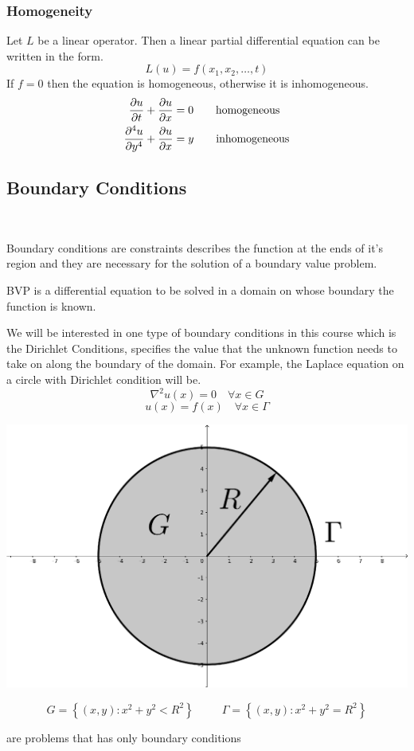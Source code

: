 \documentclass[]{article}
\begin{document}
\subsubsection{Homogeneity}
Let $L$ be a linear operator. Then a linear partial differential equation can be written in the form.
\[
    L(u) = f(x_1,x_2, \dots , t)    
\]
If $f = 0$ then the equation is homogeneous, otherwise it is inhomogeneous.
\begin{align*}
\frac{\partial u}{\partial t} + \frac{\partial u}{\partial x} &= 0 \quad\quad \text{homogeneous}
\\
\frac{\partial^4 u}{\partial y^4} + \frac{\partial u}{\partial x} &= y \quad\quad \text{inhomogeneous}
\end{align*}

\newpage

\subsection{Boundary Conditions}
\
\begin{definition}
    Boundary conditions are constraints describes the function at the ends of it's region and they are necessary for the solution of a boundary value problem.
\end{definition}
\begin{definition}
    BVP is a differential equation to be solved in a domain on whose boundary the function is known.
\end{definition}
We will be interested in one type of boundary conditions in this course which is the Dirichlet Conditions, specifies the value that the unknown function needs to take on along the boundary of the domain. For example, the Laplace equation on a circle with Dirichlet condition will be.
\[
    \nabla^2 u(x) = 0 \quad \forall x \in G    
\]
\[
    u(x) = f(x) \quad \forall x \in \Gamma    
\]
\begin{center}
\includegraphics[scale=0.1]{laplacecircle.png} 
\end{center}
\[
    G = \left\lbrace (x,y):x^2+y^2 < R^2 \right\rbrace  \quad\quad\;\ \Gamma = \left\lbrace (x,y):x^2+y^2 = R^2 \right\rbrace    
\]
\begin{definition}
    are problems that has only boundary conditions
\end{definition}
\end{document}
